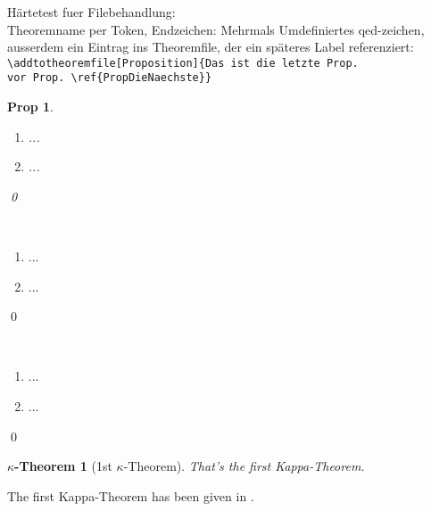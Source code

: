 \documentclass[twoside,11pt]{article}
\newtheorem*{Prop}{Prop}
\theoremstyle{lines}
\theoremstyle{longplain}
\begin{document}
H\"artetest fuer Filebehandlung: \\
Theoremname per Token,
Endzeichen: Mehrmals Umdefiniertes qed-zeichen, ausserdem ein Eintrag
ins Theoremfile, der ein sp\"ateres Label referenziert:\\
\verb|\addtotheoremfile[Proposition]{Das ist die letzte Prop. |\\
\verb|vor Prop. \ref{PropDieNaechste}}|
%
\begin{Prop}\
\begin{enumerate}
\item ...
\item ...\label{bla}
\end{enumerate}
\qed\end{Prop}

\begin{Proposition}[\the\gaga]\
\begin{enumerate}
\item ...
\item ...\the\qedsymbol\label{bla} 
\end{enumerate}
\qed\end{Proposition}

\begin{Proposition}[\the\gaga]\label{PropDieNaechste}\
\begin{enumerate}
\item ...
\item ...\the\qedsymbol\label{bla}
\end{enumerate}
\qed\end{Proposition}
 
\newtheorem{KappaTheorem}[Theorem]{\(\kappa\)-Theorem}

\begin{KappaTheorem}[1st \(\kappa\)-Theorem]\label{kappatheorem1}
That's the first Kappa-Theorem. 
\end{KappaTheorem}

 The first Kappa-Theorem has been given in .
\makeatletter
\def\@centercr{\ifhmode \unskip\else \@nolnerr\fi
       \par\@ifstar{\nobreak\@xcentercr}\@xcentercr}
\def\@xcentercr{\addvspace{-\parskip}\@ifnextchar
    [\@icentercr\ignorespaces}
\def\@icentercr[#1]{\vskip #1\ignorespaces}
\def\centering{%
  \let\\\@centercr
  \rightskip\@flushglue
  \leftskip\@flushglue
  \parindent\z@\parfillskip\z@skip}
\def\center{%
 \@ifundefined{@itemlabel}\relax
   {\newbox\bla\setbox\bla\hbox{\unskip\unhbox\@labels}\box\bla\vskip-\ht\strutbox}%
 \trivlist \centering\item\relax}
\makeatother
\end{document}
